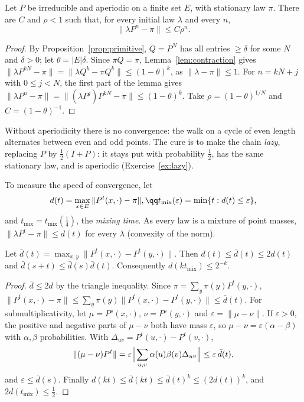 \begin{theorem}\label{thm:convergence}
Let $P$ be irreducible and aperiodic on a finite set $E$, with stationary law $\pi$. There are $C$ and $\rho<1$ such that, for every initial
law $\lambda$ and every $n$,
\[
\|\lambda P^n-\pi\|\le C\rho^n.
\]
\end{theorem}
\begin{proof}
By Proposition~\ref{prop:primitive}, $Q=P^N$ has all entries $\ge\delta$ for some $N$ and $\delta>0$; let $\theta=|E|\delta$. Since $\pi Q=\pi$, Lemma~\ref{lem:contraction}
gives $\|\lambda P^{kN}-\pi\|=\|\lambda Q^k-\pi Q^k\|\le(1-\theta)^k$, as $\|\lambda-\pi\|\le1$. For $n=kN+j$ with $0\le j<N$, the first part of the lemma gives
$\|\lambda P^n-\pi\|=\|(\lambda P^j)P^{kN}-\pi\|\le(1-\theta)^k$. Take $\rho=(1-\theta)^{1/N}$ and $C=(1-\theta)^{-1}$.
\end{proof}

Without aperiodicity there is no convergence: the walk on a cycle of even length alternates between even and odd
points. The cure is to make the chain \emph{lazy}, replacing $P$ by $\frac12(I+P)$: it stays put with probability $\frac12$, has the same
stationary law, and is aperiodic (Exercise~\ref{ex:lazy}).

To measure the speed of convergence, let
\[
\begin{gathered}d(t)=\max_{x\in E}\|P^t(x,\cdot)-\pi\|,\qq t_{\mathrm{mix}}(\varepsilon)=\min\{t:d(t)\le\varepsilon\},\end{gathered}
\]
and $t_{\mathrm{mix}}=t_{\mathrm{mix}}(\frac14)$, the \emph{mixing time}. As every law is a mixture of point masses, $\|\lambda P^t-\pi\|\le d(t)$ for every $\lambda$ (convexity of the
norm).

\begin{lemma}\label{lem:submult}
Let $\bar d(t)=\max_{x,y}\|P^t(x,\cdot)-P^t(y,\cdot)\|$. Then $d(t)\le\bar d(t)\le2d(t)$ and $\bar d(s+t)\le\bar d(s)\bar d(t)$. Consequently $d(kt_{\mathrm{mix}})\le2^{-k}$.
\end{lemma}
\begin{proof}
$\bar d\le2d$ by the triangle inequality. Since $\pi=\sum_y\pi(y)P^t(y,\cdot)$, $\|P^t(x,\cdot)-\pi\|\le\sum_y\pi(y)\|P^t(x,\cdot)-P^t(y,\cdot)\|\le\bar d(t)$. For submultiplicativity,
let $\mu=P^s(x,\cdot)$, $\nu=P^s(y,\cdot)$ and $\varepsilon=\|\mu-\nu\|$. If $\varepsilon>0$, the positive and negative parts of $\mu-\nu$ both have mass $\varepsilon$, so $\mu-\nu=\varepsilon(\alpha-\beta)$
with $\alpha,\beta$ probabilities. With $\Delta_{uv}=P^t(u,\cdot)-P^t(v,\cdot)$,
\[
\|(\mu-\nu)P^t\|=\varepsilon\Bigl\|\sum_{u,v}\alpha(u)\beta(v)\Delta_{uv}\Bigr\|\le\varepsilon\,\bar d(t),
\]
and $\varepsilon\le\bar d(s)$. Finally $d(kt)\le\bar d(kt)\le\bar d(t)^k\le(2d(t))^k$, and $2d(t_{\mathrm{mix}})\le\frac12$.
\end{proof}

